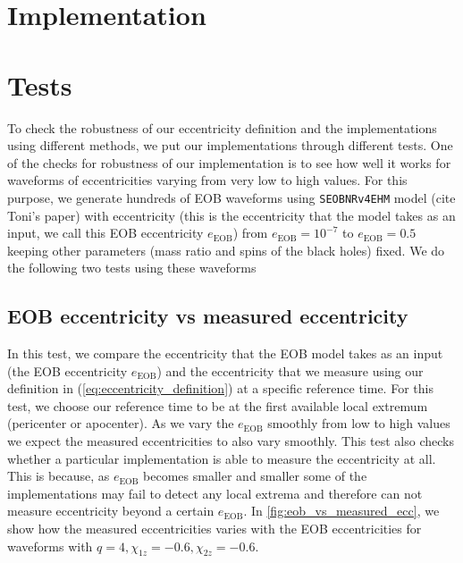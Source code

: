 \documentclass[aps,prd,amsmath,floats,floatfix, twocolumn,
superscriptaddress,nofootinbib,showpacs]{revtex4-1}
\begin{document}
\section{Implementation}
\label{sec:implementation}


\section{Tests}
\label{sec:tests}
To check the robustness of our eccentricity definition and the implementations using different methods, we put our implementations
through different tests. One of the checks for robustness of our implementation is to see how well it works for waveforms of eccentricities
varying from very low to high values. For this purpose, we generate hundreds of EOB waveforms using \texttt{SEOBNRv4EHM} model (cite Toni's paper) with eccentricity
(this is the eccentricity that the model takes as an input, we call this EOB eccentricity $e_{\text{EOB}}$) from $e_{\text{EOB}} = 10^{-7}$ to $e_{\text{EOB}} = 0.5$ keeping
other parameters (mass ratio and spins of the black holes) fixed. We do the following two tests using these waveforms

\subsection{EOB eccentricity vs measured eccentricity}
\label{sec:eob-eccentricity-vs-measured-eccentricity}
In this test, we compare the eccentricity that the EOB model takes as an input (the EOB eccentricity $e_{\text{EOB}}$) and the eccentricity that we measure using
our definition in (\ref{eq:eccentricity_definition}) at a specific reference time. For this test, we choose our reference time to be at the first available local
extremum (pericenter or apocenter). As we vary the $e_{\text{EOB}}$ smoothly from low to high values we expect the measured eccentricities to also vary smoothly.
This test also checks whether a particular implementation is able to measure the eccentricity at all. This is because, as $e_{\text{EOB}}$ becomes smaller and smaller
some of the implementations may fail to detect any local extrema and therefore can not measure eccentricity beyond a certain $e_{\text{EOB}}$. In \ref{fig:eob_vs_measured_ecc},
we show how the measured eccentricities varies with the EOB eccentricities for waveforms with $q=4, \chi_{1z}=-0.6, \chi_{2z}=-0.6$.
\end{document}
